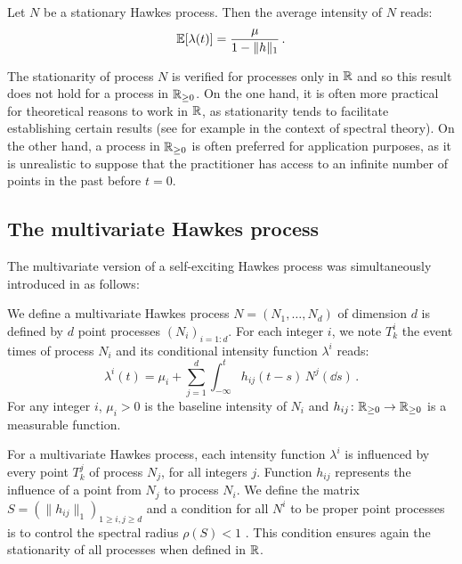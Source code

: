 \begin{proposition}
    Let $N$ be a stationary Hawkes process.
    Then the average intensity of $N$ reads:
    \[{\mathbb E}[\lambda(t)] = \frac{\mu}{1-\|h\|_1}\,.\]
\end{proposition}
The stationarity of process $N$ is verified for processes only in ${\mathbb R}$ and so this result does not hold for a process in ${\mathbb R}_{\geq 0}$.
On the one hand, it is often more practical for theoretical reasons to work in ${\mathbb R}$, as stationarity tends to facilitate establishing certain results (see \textcite{Hawkes1971} for example in the context of spectral theory).
On the other hand, a process in ${\mathbb R}_{\geq 0}$ is often preferred for application purposes, as it is unrealistic to suppose that the practitioner has access to an infinite number of points in the past before $t=0$.


\subsection{The multivariate Hawkes process}

The multivariate version of a self-exciting Hawkes process was simultaneously introduced in \textcite{Hawkes1971} as follows: 

\begin{definition}\label{def:chap1_multivariate_hawkes}
    We define a multivariate Hawkes process $N = (N_1, \ldots, N_d)$ of dimension $d$ is defined by $d$ point processes $(N_i)_{i=1:d}$.
    For each integer $i$, we note $T_k^i$ the event times of process $N_i$ and its conditional intensity function $\lambda^i$ reads:
    \[\lambda^i(t) = \mu_i + \sum_{j=1}^{d}\int_{-\infty}^{t}{h_{ij}(t-s)}\,N^j(\dd s)\,.\]
    For any integer $i$, $\mu_i>0$ is the baseline intensity of $N_i$ and $h_{ij}\colon{\mathbb R}_{\geq 0}\to {\mathbb R}_{\geq 0}$ is a measurable function.
\end{definition}
For a multivariate Hawkes process, each intensity function $\lambda^i$ is influenced by every point $T_k^j$ of process $N_j$, for all integers $j$.
Function $h_{ij}$ represents the influence of a point from $N_j$ to process $N_i$. We define the matrix $S = (\|h_{ij}\|_1)_{1 \geq i,j \geq d}$ and a condition for all $N^i$ to be proper point processes is to control the spectral radius $\rho(S) < 1$ \parencite{Bacry2015}.
This condition ensures again the stationarity of all processes when defined in ${\mathbb R}$.

